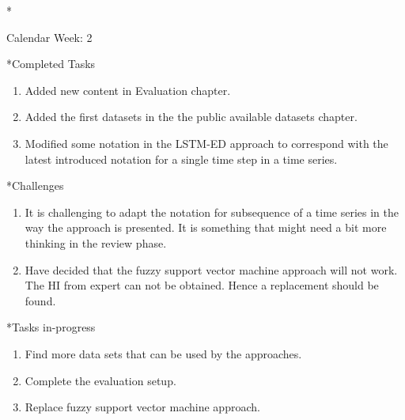 \documentclass[11pt,a4paper]{article}
\begin{document}
\newpage
\begin{section}*{Calendar Week: 2 \hfill \date{15 January, 2021}}
 \begin{refsection}

       \begin{subsection}*{Completed Tasks}
             \begin{enumerate}
                   \item
                         Added new content in Evaluation chapter.
                   \item
                         Added the first datasets in the the public available datasets chapter.
                   \item
                         Modified some notation in the LSTM-ED approach to correspond with the latest
                         introduced notation for a single time step in a time series.
             \end{enumerate}
       \end{subsection}

       \begin{subsection}*{Challenges}
             \begin{enumerate}
                   \item
                         It is challenging to adapt the notation for subsequence of a time series in
                         the way the approach is presented. It is something that might need a bit more
                         thinking in the review phase.
                   \item
                         Have decided that the fuzzy support vector machine approach will not work. The
                         HI from expert can not be obtained. Hence a replacement should be found.
             \end{enumerate}
       \end{subsection}

       \begin{subsection}*{Tasks in-progress}
             \begin{enumerate}
                   \item
                         Find more data sets that can be used by the approaches.
                   \item
                         Complete the evaluation setup.
                   \item
                         Replace fuzzy support vector machine approach.
             \end{enumerate}
       \end{subsection}

 \end{refsection}
\end{section}
\end{document}
